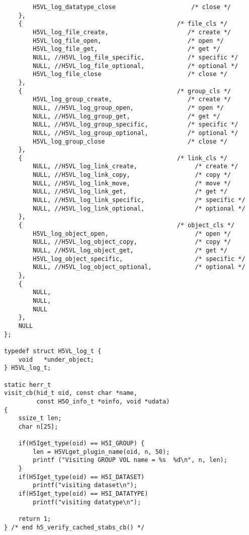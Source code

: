 \begin{appendices}
\begin{lstlisting}
        H5VL_log_datatype_close                     /* close */
    },
    {                                           /* file_cls */
        H5VL_log_file_create,                      /* create */
        H5VL_log_file_open,                        /* open */
        H5VL_log_file_get,                         /* get */
        NULL, //H5VL_log_file_specific,            /* specific */
        NULL, //H5VL_log_file_optional,            /* optional */
        H5VL_log_file_close                        /* close */
    },
    {                                           /* group_cls */
        H5VL_log_group_create,                     /* create */
        NULL, //H5VL_log_group_open,               /* open */
        NULL, //H5VL_log_group_get,                /* get */
        NULL, //H5VL_log_group_specific,           /* specific */
        NULL, //H5VL_log_group_optional,           /* optional */
        H5VL_log_group_close                       /* close */
    },
    {                                           /* link_cls */
        NULL, //H5VL_log_link_create,                /* create */
        NULL, //H5VL_log_link_copy,                  /* copy */
        NULL, //H5VL_log_link_move,                  /* move */
        NULL, //H5VL_log_link_get,                   /* get */
        NULL, //H5VL_log_link_specific,              /* specific */
        NULL, //H5VL_log_link_optional,              /* optional */
    },
    {                                           /* object_cls */
        H5VL_log_object_open,                        /* open */
        NULL, //H5VL_log_object_copy,                /* copy */
        NULL, //H5VL_log_object_get,                 /* get */
        H5VL_log_object_specific,                    /* specific */
        NULL, //H5VL_log_object_optional,            /* optional */
    },
    {
        NULL,
        NULL,
        NULL
    },
    NULL
};

typedef struct H5VL_log_t {
    void   *under_object;
} H5VL_log_t;

static herr_t
visit_cb(hid_t oid, const char *name,
         const H5O_info_t *oinfo, void *udata)
{
    ssize_t len;
    char n[25];

    if(H5Iget_type(oid) == H5I_GROUP) {
        len = H5VLget_plugin_name(oid, n, 50);
        printf ("Visiting GROUP VOL name = %s  %d\n", n, len);
    }
    if(H5Iget_type(oid) == H5I_DATASET) 
        printf("visiting dataset\n");
    if(H5Iget_type(oid) == H5I_DATATYPE) 
        printf("visiting datatype\n");

    return 1;
} /* end h5_verify_cached_stabs_cb() */


\end{lstlisting}
\end{appendices}
